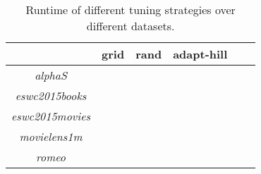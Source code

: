 \begin{table}[h!]
    \centering
    \begin{tabular}{| c | c | c | c | c | c | }
        \hline
        \textbf{}               & \textbf{grid} & \textbf{rand} & \textbf{adapt-hill} \\ \hline


        \textit{alphaS}         &               &               &               \\ \hline
        \textit{eswc2015books}  &               &               &               \\ \hline
        \textit{eswc2015movies} &               &               &               \\ \hline
        \textit{movielens1m}    &               &               &               \\ \hline
        \textit{romeo}          &               &               &               \\ \hline


    \end{tabular}
    \caption{Runtime of different tuning strategies over different datasets.}
    \label{tab:linkanalysis_tuning_sec}
\end{table}
